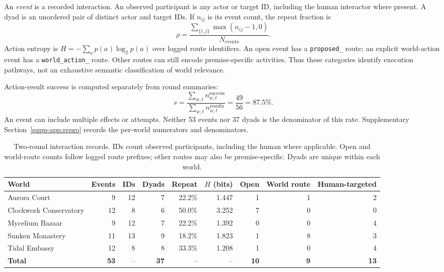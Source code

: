 An \emph{event} is a recorded interaction. An observed participant is any
actor or target ID, including the human interactor where present. A dyad is an
unordered pair of distinct actor and target IDs. If $n_{ij}$ is its event
count, the repeat fraction is
\begin{equation}
\rho=\frac{\sum_{\{i,j\}}\max(n_{ij}-1,0)}{N_{\mathrm{events}}}.
\end{equation}
Action entropy is $H=-\sum_a p(a)\log_2p(a)$ over logged route identifiers.
An open event has a \texttt{proposed\_} route; an explicit world-action event
has a \texttt{world\_action\_} route. Other routes can still encode
premise-specific activities. Thus these categories identify execution
pathways, not an exhaustive semantic classification of world relevance.

Action-result success is computed separately from round summaries:
\begin{equation}
s=\frac{\sum_{w,t}n^{\mathrm{success}}_{w,t}}
{\sum_{w,t}n^{\mathrm{results}}_{w,t}}=\frac{49}{56}=87.5\%.
\end{equation}
An event can include multiple effects or attempts. Neither 53 events nor
37 dyads is the denominator of this rate. Supplementary Section~\ref{supp-app:repro} records the
per-world numerators and denominators.

\begin{table}[t]
\centering\small
\setlength{\tabcolsep}{5pt}
\begin{tabularx}{\textwidth}{@{}Yrrrrrrrr@{}}
\toprule
World & Events & IDs & Dyads & Repeat & $H$ (bits) & Open & World route & Human-targeted \\
\midrule
Aurora Court & 9 & 12 & 7 & 22.2\% & 1.447 & 1 & 1 & 2 \\
Clockwork Conservatory & 12 & 8 & 6 & 50.0\% & 3.252 & 7 & 0 & 0 \\
Mycelium Bazaar & 9 & 12 & 7 & 22.2\% & 1.392 & 0 & 0 & 4 \\
Sunken Monastery & 11 & 13 & 9 & 18.2\% & 1.823 & 1 & 8 & 3 \\
Tidal Embassy & 12 & 8 & 8 & 33.3\% & 1.208 & 1 & 0 & 4 \\
\midrule
\textbf{Total} & \textbf{53} & -- & \textbf{37} & -- & -- & \textbf{10} & \textbf{9} & \textbf{13} \\
\bottomrule
\end{tabularx}
\caption{Two-round interaction records. IDs count observed participants,
including the human where applicable. Open and world-route counts follow
logged route prefixes; other routes may also be premise-specific. Dyads are
unique within each world.}
\label{tab:multiworld}
\end{table}

